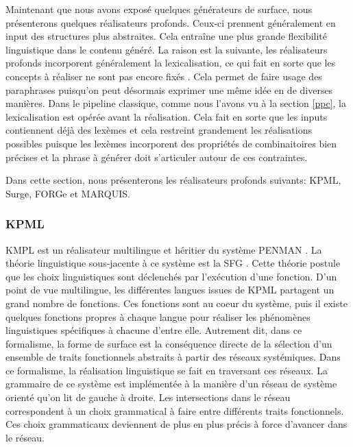 Maintenant que nous avons exposé quelques générateurs de surface, nous présenterons quelques réalisateurs profonds. Ceux-ci prennent généralement en input des structures plus abstraites. Cela entraîne une plus grande flexibilité linguistique dans le contenu généré. La raison est la suivante, les réalisateurs profonds incorporent généralement la lexicalisation, ce qui fait en sorte que les concepts à réaliser ne sont pas encore fixés \citep{PolguerePourmodelestratifie}. Cela permet de faire usage des paraphrases puisqu'on peut désormais exprimer une même idée en de diverses manières. Dans le pipeline classique, comme nous l'avons vu à la section \ref{ppc}, la lexicalisation est opérée avant la réalisation. Cela fait en sorte que les inputs contiennent déjà des lexèmes et cela restreint grandement les réalisations possibles puisque les lexèmes incorporent des propriétés de combinaitoires bien précises et la phrase à générer doit s'articuler autour de ces contraintes. 

Dans cette section, nous présenterons les réalisateurs profonds suivants: KPML, Surge, FORGe et MARQUIS.

\subsubsection{KPML}
KMPL\citep{BatemanEnablingTechnologyMultilingual1997} est un réalisateur multilingue et héritier du système PENMAN \citep{PenmanOverview}. La théorie linguistique sous-jacente à ce système est la \acf{SFG} \citep{MatthiessenSystemicfunctionalgrammar1997}. Cette théorie postule que les choix linguistiques sont déclenchés par l'exécution d'une fonction. D'un point de vue multilingue, les différentes langues issues de KPML partagent un grand nombre de fonctions. Ces fonctions sont au coeur du système, puis il existe quelques fonctions propres à chaque langue pour réaliser les phénomènes linguistiques spécifiques à chacune d'entre elle. Autrement dit, dans ce formalisme, la forme de surface est la conséquence directe de la sélection d'un ensemble de traits fonctionnels abstraits à partir des réseaux systémiques. Dans ce formalisme, la réalisation linguistique se fait en traversant ces réseaux. La grammaire de ce système est implémentée à la manière d'un réseau de système orienté qu'on lit de gauche à droite. Les intersections dans le réseau correspondent à un choix grammatical à faire entre différents traits fonctionnels. Ces choix grammaticaux deviennent de plus en plus précis à force d'avancer dans le réseau. 


